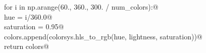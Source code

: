 \documentclass[10.0pt]{report}
\begin{document}
\begin{appendices}
\begin{flushleft}
\begin{list}{}{}
\mbox{}\verb@    for i in np.arange(60., 360., 300. / num_colors):@\\
\mbox{}\verb@        hue        = i/360.0@\\
\mbox{}\verb@        saturation = 0.95@\\
\mbox{}\verb@        colors.append(colorsys.hls_to_rgb(hue, lightness, saturation))@\\
\mbox{}\verb@    return colors@\\
\mbox{}\verb@@{\NWsep}
\end{list}
\vspace{-1.5ex}
\footnotesize
\begin{list}{}{\setlength{\itemsep}{-\parsep}\setlength{\itemindent}{-\leftmargin}}

\item{}
\end{list}
\vspace{4ex}
\end{flushleft}
\end{appendices}
\end{document}
